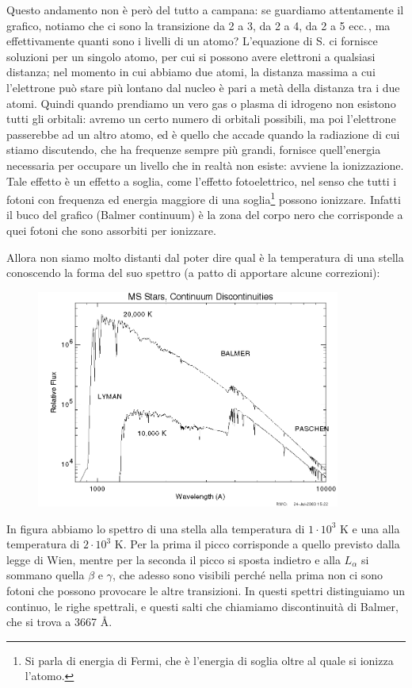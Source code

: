 Questo andamento non è però del tutto a campana: se guardiamo attentamente il grafico, notiamo che ci sono la transizione da 2 a 3, da 2 a 4, da 2 a 5 ecc.\,, ma effettivamente quanti sono i livelli di un atomo? L'equazione di S. ci fornisce soluzioni per un singolo atomo, per cui si possono avere elettroni a qualsiasi distanza; nel momento in cui abbiamo due atomi, la distanza massima a cui l'elettrone può stare più lontano dal nucleo è pari a metà della distanza tra i due atomi. Quindi quando prendiamo un vero gas o plasma di idrogeno non esistono tutti gli orbitali: avremo un certo numero di orbitali possibili, ma poi l'elettrone passerebbe ad un altro atomo, ed è quello che accade quando la radiazione di cui stiamo discutendo, che ha frequenze sempre più grandi, fornisce quell'energia necessaria per occupare un livello che in realtà non esiste: avviene la ionizzazione. Tale effetto è un effetto a soglia, come l'effetto fotoelettrico, nel senso che tutti i fotoni con frequenza ed energia maggiore di una soglia\footnote{Si parla di energia di Fermi, che è l'energia di soglia oltre al quale si ionizza l'atomo.} possono ionizzare. Infatti il buco del grafico (Balmer continuum) è la zona del corpo nero che corrisponde a quei fotoni che sono assorbiti per ionizzare.

Allora non siamo molto distanti dal poter dire qual è la temperatura di una stella conoscendo la forma del suo spettro (a patto di apportare alcune correzioni):

\begin{figure}[H]
   \centering
   \includegraphics[width=10cm]{immagini/spettro_stella_2.png}
\end{figure}

In figura abbiamo lo spettro di una stella alla temperatura di $1 \cdot 10^3$ K e una alla temperatura di $2 \cdot 10^3$ K. Per la prima il picco corrisponde a quello previsto dalla legge di Wien, mentre per la seconda il picco si sposta indietro e alla $L_{\alpha}$ si sommano quella $\beta$ e $\gamma$, che adesso sono visibili perché nella prima non ci sono fotoni che possono provocare le altre transizioni. In questi spettri distinguiamo un continuo, le righe spettrali, e questi salti che chiamiamo discontinuità di Balmer, che si trova a 3667 \AA.

